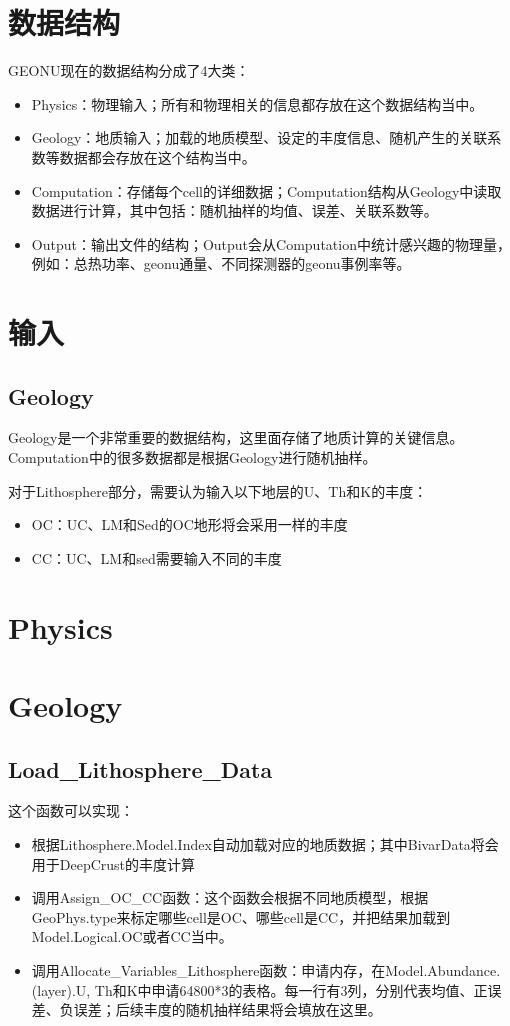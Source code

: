 
\usepackage{ctex}


\chapter{数据结构}
	GEONU现在的数据结构分成了4大类：
		\begin{itemize}
			\item Physics：物理输入；所有和物理相关的信息都存放在这个数据结构当中。
			\item Geology：地质输入；加载的地质模型、设定的丰度信息、随机产生的关联系数等数据都会存放在这个结构当中。
			\item Computation：存储每个cell的详细数据；Computation结构从Geology中读取数据进行计算，其中包括：随机抽样的均值、误差、关联系数等。
			\item Output：输出文件的结构；Output会从Computation中统计感兴趣的物理量，例如：总热功率、geonu通量、不同探测器的geonu事例率等。
		\end{itemize}
\chapter{输入}
	\section{Geology}
		Geology是一个非常重要的数据结构，这里面存储了地质计算的关键信息。Computation中的很多数据都是根据Geology进行随机抽样。\par
		对于Lithosphere部分，需要认为输入以下地层的U、Th和K的丰度：
			\begin{itemize}
				\item OC：UC、LM和Sed的OC地形将会采用一样的丰度
				\item CC：UC、LM和sed需要输入不同的丰度
			\end{itemize}
\chapter{Physics}
\chapter{Geology}
	\section{Load\_Lithosphere\_Data}
		这个函数可以实现：
			\begin{itemize}
				\item 根据Lithosphere.Model.Index自动加载对应的地质数据；其中BivarData将会用于DeepCrust的丰度计算
				\item 调用Assign\_OC\_CC函数：这个函数会根据不同地质模型，根据GeoPhys.type来标定哪些cell是OC、哪些cell是CC，并把结果加载到Model.Logical.OC或者CC当中。
				\item 调用Allocate\_Variables\_Lithosphere函数：申请内存，在Model.Abundance.(layer).U, Th和K中申请64800*3的表格。每一行有3列，分别代表均值、正误差、负误差；后续丰度的随机抽样结果将会填放在这里。
			\end{itemize}
